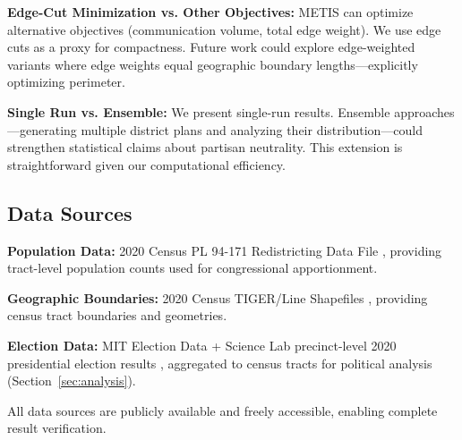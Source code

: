\textbf{Edge-Cut Minimization vs. Other Objectives:} METIS can optimize alternative objectives (communication volume, total edge weight). We use edge cuts as a proxy for compactness. Future work could explore edge-weighted variants where edge weights equal geographic boundary lengths—explicitly optimizing perimeter.

\textbf{Single Run vs. Ensemble:} We present single-run results. Ensemble approaches—generating multiple district plans and analyzing their distribution—could strengthen statistical claims about partisan neutrality. This extension is straightforward given our computational efficiency.

\subsection{Data Sources}

\textbf{Population Data:} 2020 Census PL 94-171 Redistricting Data File \cite{census2020redistricting}, providing tract-level population counts used for congressional apportionment.

\textbf{Geographic Boundaries:} 2020 Census TIGER/Line Shapefiles \cite{census2020tigerline}, providing census tract boundaries and geometries.

\textbf{Election Data:} MIT Election Data + Science Lab precinct-level 2020 presidential election results \cite{medsl2020}, aggregated to census tracts for political analysis (Section~\ref{sec:analysis}).

All data sources are publicly available and freely accessible, enabling complete result verification.
